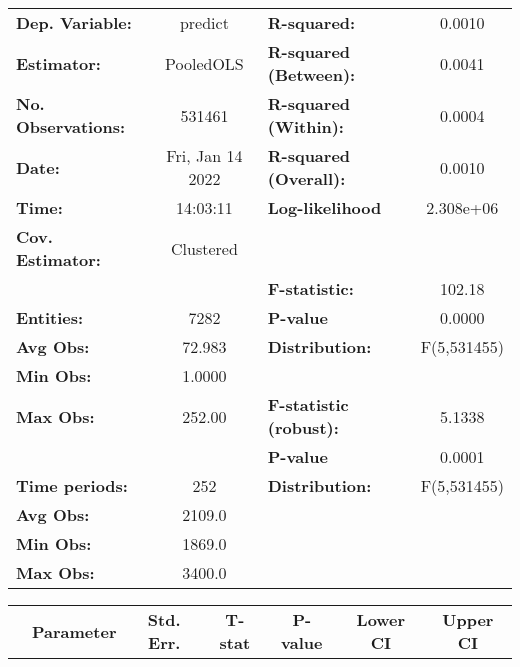 \begin{center}
\begin{tabular}{lclc}
\toprule
\textbf{Dep. Variable:}    &      predict       & \textbf{  R-squared:         }   &      0.0010      \\
\textbf{Estimator:}        &     PooledOLS      & \textbf{  R-squared (Between):}  &      0.0041      \\
\textbf{No. Observations:} &       531461       & \textbf{  R-squared (Within):}   &      0.0004      \\
\textbf{Date:}             &  Fri, Jan 14 2022  & \textbf{  R-squared (Overall):}  &      0.0010      \\
\textbf{Time:}             &      14:03:11      & \textbf{  Log-likelihood     }   &    2.308e+06     \\
\textbf{Cov. Estimator:}   &     Clustered      & \textbf{                     }   &                  \\
\textbf{}                  &                    & \textbf{  F-statistic:       }   &      102.18      \\
\textbf{Entities:}         &        7282        & \textbf{  P-value            }   &      0.0000      \\
\textbf{Avg Obs:}          &       72.983       & \textbf{  Distribution:      }   &   F(5,531455)    \\
\textbf{Min Obs:}          &       1.0000       & \textbf{                     }   &                  \\
\textbf{Max Obs:}          &       252.00       & \textbf{  F-statistic (robust):} &      5.1338      \\
\textbf{}                  &                    & \textbf{  P-value            }   &      0.0001      \\
\textbf{Time periods:}     &        252         & \textbf{  Distribution:      }   &   F(5,531455)    \\
\textbf{Avg Obs:}          &       2109.0       & \textbf{                     }   &                  \\
\textbf{Min Obs:}          &       1869.0       & \textbf{                     }   &                  \\
\textbf{Max Obs:}          &       3400.0       & \textbf{                     }   &                  \\
\bottomrule
\end{tabular}
\begin{tabular}{lcccccc}
                & \textbf{Parameter} & \textbf{Std. Err.} & \textbf{T-stat} & \textbf{P-value} & \textbf{Lower CI} & \textbf{Upper CI}  \\

\end{tabular}
\end{center}
